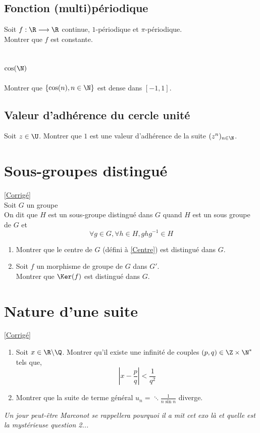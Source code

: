\documentclass[8pt]{book}
\begin{document}
	\subsection{Fonction (multi)périodique }
	Soit $f:\R \longrightarrow \R$ continue, $1$-périodique et $\pi$-périodique.\\
	Montrer que $f$ est constante.
	
	\subsection{$\cos(\N)$ }
	Montrer que $\{\cos(n),n\in \N\}$ est dense dans $[-1,1]$.
	
	\subsection{Valeur d'adhérence du cercle unité }
	Soit $z\in \U$. Montrer que $1$ est une valeur d'adhérence de la suite $(z^n)_{n\in \N}$.
	
	\section{Sous-groupes distingué }
	\label{Sous-groupes distingués}
	\textcolor{blue}{\hyperref[Sous-groupes distingué corrigé]{[Corrigé]}}\\
	Soit $G$ un groupe\\
	On dit que $H$ est un sous-groupe distingué dans $G$ quand $H$ est un sous groupe de $G$ et \[\forall g\in G,\forall h\in H, ghg^{-1}\in H\]
	\begin{enumerate}
		\item Montrer que le centre de $G$ (défini à \ref{Centre}) est distingué dans $G$.
		\item Soit $f$ un morphisme de groupe de $G$ dans $G'$.\\ Montrer que $\Ker(f)$ est distingué dans $G$.
	\end{enumerate}
	
	\section{Nature d'une suite}
	\label{Nature d'une suite}
	\textcolor{blue}{\hyperref[Nature d'une suite corrigé]{[Corrigé]}}\\
	\begin{enumerate}[leftmargin=*]
		\item Soit $x\in \R\backslash\Q$. Montrer qu'il existe une infinité de couples $(p,q)\in \Z\times \N^*$ tels que,
		$$\left|x-\frac{p}{q}\right|<\frac{1}{q^2}$$
		\item Montrer que la suite de terme général $u_n=\ddots\frac{1}{n\sin n}$ diverge.
	\end{enumerate}
	\textit{Un jour peut-être Marconot se rappellera pourquoi il a mit cet exo là et quelle est la mystérieuse question 2...}
	
\end{document}
